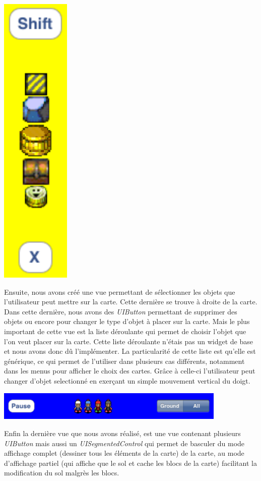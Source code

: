 		\begin{center}
			\includegraphics{./Developpement/Img/menu_droite.pdf}
		\end{center}
			
		Ensuite, nous avons créé une vue permettant de sélectionner les objets que l'utilisateur peut mettre sur la carte. Cette dernière se trouve à droite de la carte. Dans cette dernière, nous avons des \textit{UIButton} permettant de supprimer des objets ou encore pour changer le type d'objet à placer sur la carte. Mais le plus important de cette vue est la liste déroulante qui permet de choisir l'objet que l'on veut placer sur la carte. Cette liste déroulante n'étais pas un \gls{widget} de base et nous avons donc dû l'implémenter. La particularité de cette liste est qu'elle est générique, ce qui permet de l'utiliser dans plusieurs cas différents, notamment dans les menus pour afficher le choix des cartes. Grâce à celle-ci l'utilisateur peut changer d'objet selectionné en exerçant un simple mouvement vertical du doigt.
			
		\begin{center}
			\includegraphics[width=11cm]{./Developpement/Img/menu_haut.pdf}
		\end{center}
		Enfin la dernière vue que nous avons réalisé, est une vue contenant plusieurs \textit{UIButton} mais aussi un \textit{UISegmentedControl} qui permet de basculer du mode affichage complet (dessiner tous les éléments de la carte) de la carte, au mode d'affichage partiel (qui affiche que le sol et cache les blocs de la carte) facilitant la modification du sol malgrès les blocs.
			
